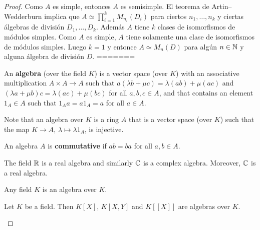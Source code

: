\begin{proof}
	Como $A$ es simple, entonces $A$ es semisimple. El teorema de Artin--Wedderburn implica que $A\simeq\prod_{i=1}^k M_{n_i}(D_i)$ 
	para ciertos $n_1,\dots,n_k$ y ciertas álgebras de división $D_1,\dots,D_k$. Además $A$ tiene
	$k$ clases de isomorfismos de módulos simples. Como $A$ es simple,
	$A$ tiene solamente una clase de isomorfismos de módulos simples. Luego $k=1$ y entonce
	$A\simeq M_n(D)$ para algún $n\in\mathbb{N}$ y alguna álgebra de división $D$. 
=======
\begin{definition}
	An \textbf{algebra} (over the field $K$) is a vector space (over $K$) 
	with an associative multiplication $A\times A\to A$ such that
	$a(\lambda b+\mu c)=\lambda(ab)+\mu(ac)$ and
	$(\lambda a+\mu b)c=\lambda(ac)+\mu (bc)$ for all $a,b,c\in A$, and 
	that contains an element $1_A\in A$ such that $1_Aa=a1_A=a$ for all $a\in A$.   
\end{definition}

Note that an algebra over $K$ is a ring $A$ that is a vector space
(over $K$) such that the map $K\to A$, $\lambda\mapsto \lambda1_A$, is injective. 

\begin{definition}
	An algebra $A$ is \textbf{commutative} if $ab=ba$ for all $a,b\in A$. 
\end{definition}

\begin{example}
	The field $\mathbb{R}$ is a real algebra and similarly 
	$\mathbb{C}$ is a complex algebra. Moreover, $\mathbb{C}$ is a real algebra. 
\end{example}

Any field $K$ is an algebra over $K$.

\begin{example}
	Let $K$ be a field. Then $K[X]$, $K[X,Y]$ and $K[[X]]$ are algebras over $K$.
\end{example}


\end{proof}

